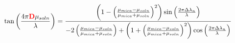 \documentclass[preview,20pt]{standalone}
\begin{document}
\[
    \tan\bigg(\frac{4\pi\textcolor{red}{\textbf D}\mu_{soln}}{\lambda}\bigg) = \frac{\left(1-\left(\frac{\mu_{mica}-\mu_{soln}}{\mu_{mica}+\mu_{soln}}\right)^2\right)\sin\left(\frac{2\pi\Delta\lambda_n}{\lambda_{ }}\right)}{-2\left(\frac{\mu_{mica}-\mu_{soln}}{\mu_{mica}+\mu_{soln}}\right)+\left(1+\left(\frac{\mu_{mica}-\mu_{soln}}{\mu_{mica}+\mu_{soln}}\right)^2\right)\cos\left(\frac{2\pi\Delta\lambda_n}{\lambda_{ }}\right)}
\]
\end{document}

